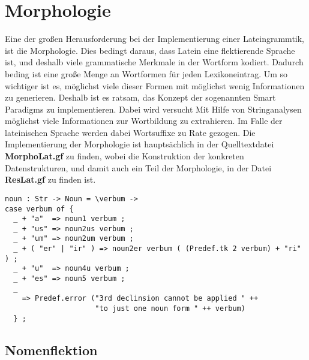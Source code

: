 \documentclass[12pt,abstract=on,titlepage,bibliography=totoc,ngerman,listof=totoc]{scrreprt}
\begin{document}
\section{Morphologie}
\label{sec:morpho}
Eine der großen Herausforderung bei der Implementierung einer Lateingrammtik, ist die Morphologie. Dies bedingt daraus, dass Latein eine flektierende Sprache ist, und deshalb viele grammatische Merkmale in der Wortform kodiert. Dadurch beding ist eine große Menge an Wortformen für jeden Lexikoneintrag. Um so wichtiger ist es, möglichst viele dieser Formen mit möglichst wenig Informationen zu generieren. Deshalb ist es ratsam, das Konzept der sogenannten Smart Paradigms zu implementieren. Dabei wird versucht Mit Hilfe von Stringanalysen möglichst viele Informationen zur Wortbildung zu extrahieren. Im Falle der lateinischen Sprache werden dabei Wortsuffixe zu Rate gezogen. Die Implementierung der Morphologie ist hauptsächlich in der Quelltextdatei \textbf{MorphoLat.gf} zu finden, wobei die Konstruktion der konkreten Datenstrukturen, und damit auch ein Teil der Morphologie, in der Datei \textbf{ResLat.gf} zu finden ist.
\begin{lstlisting}[float=ht,caption={Beispiel für ein Smart Paradigm mit Hilfe von Pattern matching},label={GF-Morpho-Noun}]
noun : Str -> Noun = \verbum -> 
case verbum of {
  _ + "a"  => noun1 verbum ;
  _ + "us" => noun2us verbum ;
  _ + "um" => noun2um verbum ;
  _ + ( "er" | "ir" ) => noun2er verbum ( (Predef.tk 2 verbum) + "ri" ) ;
  _ + "u"  => noun4u verbum ;
  _ + "es" => noun5 verbum ;
  _  
    => Predef.error ("3rd declinsion cannot be applied " ++ 
                     "to just one noun form " ++ verbum)
  } ;
\end{lstlisting}
\subsection{Nomenflektion}
\label{subsec:nomen}
\end{document}
